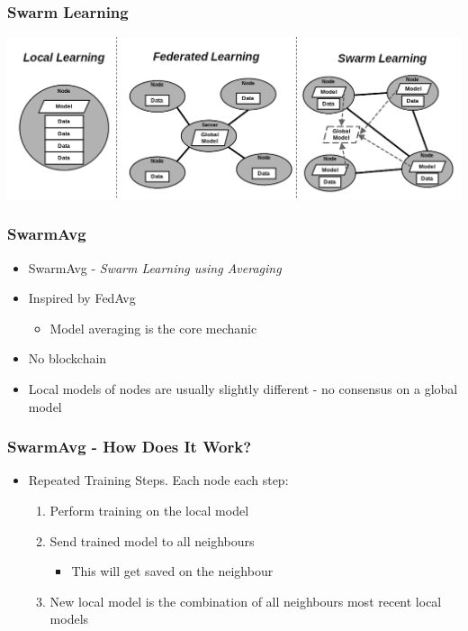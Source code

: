 \documentclass{beamer}
\begin{document}
	\begin{frame}
		\frametitle{Swarm Learning}
		\includegraphics[width=\linewidth]{fedvsswarm}
	\end{frame}

	\begin{frame}
		\frametitle{SwarmAvg}
		\begin{itemize}
			\item SwarmAvg - \emph{Swarm Learning using Averaging}
			\item Inspired by FedAvg
			\begin{itemize}
				\item Model averaging is the core mechanic
			\end{itemize}
			\item No blockchain
			\item Local models of nodes are usually slightly different - no consensus on a global model
		\end{itemize}
	\end{frame}

	\begin{frame}
		\frametitle{SwarmAvg - How Does It Work?}
		\begin{itemize}
			\item Repeated Training Steps. Each node each step:
			\begin{enumerate}
				\item Perform training on the local model
				\item Send trained model to all neighbours
				\begin{itemize}
					\item This will get saved on the neighbour
				\end{itemize}
				\item New local model is the combination of all neighbours most recent local models
			\end{enumerate}
		\end{itemize}
	\end{frame}
\end{document}
